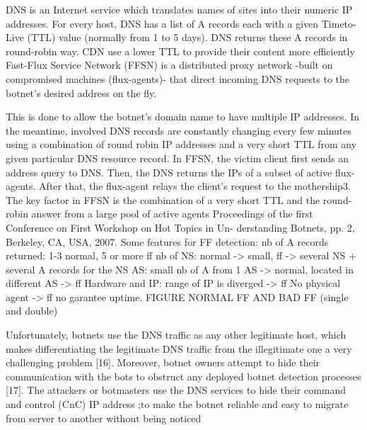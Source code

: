 DNS is an Internet service which translates names of sites into their numeric IP addresses. For
every host, DNS has a list of A records each with a given Timeto- Live (TTL) value (normally from 1
to 5 days). DNS returns these A records in round-robin way.
CDN use a lower TTL to provide their content more efficiently
Fast-Flux Service Network (FFSN) is a distributed proxy network -built on compromised machines
(flux-agents)- that direct incoming DNS requests to the botnet’s desired address on the fly.

This is done to allow the botnet’s domain name to have multiple IP addresses. In the meantime,
involved DNS records are constantly changing every few minutes using a combination of round robin
IP addresses and a very short TTL from any given particular DNS resource record.
In FFSN, the victim client first sends an address query to DNS. Then, the DNS returns the IPs of a
subset of active flux-agents. After that, the flux-agent relays the client’s request to the mothership3.
The key factor in FFSN is the combination of a very short TTL and the round-robin answer from a
large pool of active agents
Proceedings of the first Conference on First Workshop on Hot Topics in Un- derstanding Botnets, pp.
2, Berkeley, CA, USA, 2007.
Some features for FF detection: nb of A records returned: 1-3 normal, 5 or more ff nb of NS: normal
-> small, ff -> several NS + several A records for the NS AS: small nb of A from 1 AS -> normal,
located in different AS -> ff Hardware and IP: range of IP is diverged -> ff No physical agent -> ff no
garantee uptime.
FIGURE NORMAL FF AND BAD FF (single and double)

Unfortunately, botnets use the DNS traffic as any other legitimate host, which makes differentiating
the legitimate DNS traffic from the illegitimate one a very challenging problem [16]. Moreover,
botnet owners attempt to hide their communication with the bots to obstruct any deployed botnet
detection processes [17]. The attackers or botmasters use the DNS services to hide their command
and control (CnC) IP address ;to make the botnet reliable and easy to migrate from server to
another without being noticed

